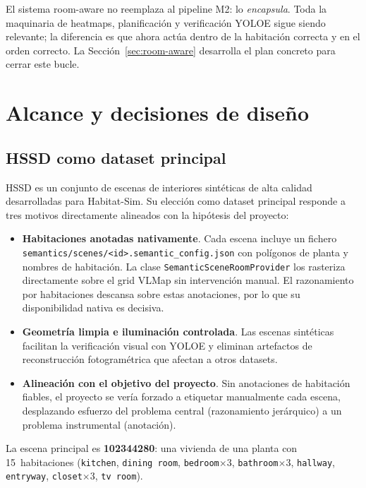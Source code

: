 \documentclass[11pt,a4paper]{article}
\begin{document}
El sistema room-aware no reemplaza al pipeline M2: lo \emph{encapsula}. Toda la
maquinaria de heatmaps, planificación y verificación YOLOE sigue siendo
relevante; la diferencia es que ahora actúa dentro de la habitación correcta y
en el orden correcto. La Sección~\ref{sec:room-aware} desarrolla el plan
concreto para cerrar este bucle.

\section{Alcance y decisiones de diseño}

\subsection{HSSD como dataset principal}

HSSD es un conjunto de escenas de interiores sintéticas de alta calidad
desarrolladas para Habitat-Sim. Su elección como dataset principal responde a
tres motivos directamente alineados con la hipótesis del proyecto:

\begin{itemize}
  \item \textbf{Habitaciones anotadas nativamente}. Cada escena incluye un
        fichero \texttt{semantics/scenes/<id>.semantic\_config.json} con
        polígonos de planta y nombres de habitación. La clase
        \texttt{SemanticSceneRoomProvider} los rasteriza directamente sobre el
        grid VLMap sin intervención manual. El razonamiento por habitaciones
        descansa sobre estas anotaciones, por lo que su disponibilidad nativa
        es decisiva.
  \item \textbf{Geometría limpia e iluminación controlada}. Las escenas
        sintéticas facilitan la verificación visual con YOLOE y eliminan
        artefactos de reconstrucción fotogramétrica que afectan a otros
        datasets.
  \item \textbf{Alineación con el objetivo del proyecto}. Sin anotaciones de
        habitación fiables, el proyecto se vería forzado a etiquetar
        manualmente cada escena, desplazando esfuerzo del problema central
        (razonamiento jerárquico) a un problema instrumental (anotación).
\end{itemize}

La escena principal es \textbf{102344280}: una vivienda de una planta con
15~habitaciones (\texttt{kitchen}, \texttt{dining room}, \texttt{bedroom}$\times$3,
\texttt{bathroom}$\times$3, \texttt{hallway}, \texttt{entryway},
\texttt{closet}$\times$3, \texttt{tv room}).
\end{document}
